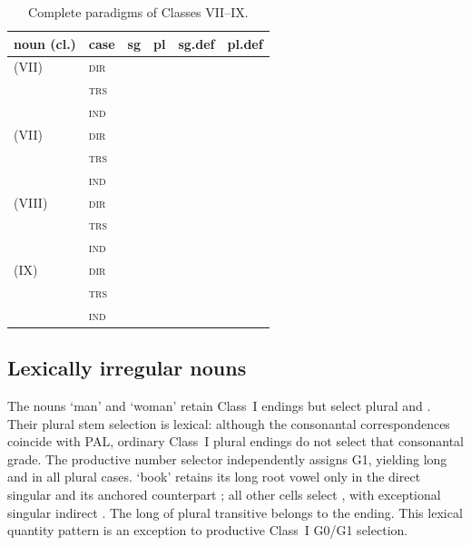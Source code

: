 \begin{table}[ht]
  \footnotesize
  \caption{Complete paradigms of Classes VII--IX.}
  \label{tab:nm-paradigms-vii-ix}
  \begin{tabularx}{\textwidth}{l l L L L L}
    \toprule
    {\sc noun (cl.)} & {\sc case} & {\sc sg} & {\sc pl}
      & {\sc sg.def} & {\sc pl.def} \\
    \midrule
     (VII) & \textsc{dir} &  &  &  &  \\
     & \textsc{trs} &  &  &  &  \\
     & \textsc{ind} &  &  &  &  \\
    \addlinespace
     (VII) & \textsc{dir} &  &  &  &  \\
     & \textsc{trs} &  &  &  &  \\
     & \textsc{ind} &  &  &  &  \\
    \addlinespace
     (VIII) & \textsc{dir} &  &  &  &  \\
     & \textsc{trs} &  &  &  &  \\
     & \textsc{ind} &  &  &  &  \\
    \addlinespace
     (IX) & \textsc{dir} &  &  &  &  \\
     & \textsc{trs} &  &  &  &  \\
     & \textsc{ind} &  &  &  &  \\
    \bottomrule
  \end{tabularx}
\end{table}
\FloatBarrier

\subsection{Lexically irregular nouns}
\label{sec:nm-irregular}

The nouns  `man' and  `woman' retain Class~I endings but select
plural  and . Their plural stem selection is lexical:
although the consonantal correspondences coincide with PAL, ordinary Class~I
plural endings do not select that consonantal grade. The productive number
selector independently assigns G1, yielding long  and
 in all plural cases. 
`book' retains its long root vowel only in the direct singular and its
anchored counterpart ; all other cells select , with
exceptional singular indirect . The long  of plural
transitive  belongs to the ending. This lexical quantity pattern
is an exception to productive Class~I G0/G1 selection.

